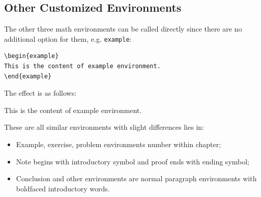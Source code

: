 \documentclass[11pt]{elegantbook}
\begin{document}
\subsection{Other Customized Environments}
The other three math environments can be called directly since there are no additional option for them, e.g. \lstinline{example}:
\begin{lstlisting}
\begin{example}
This is the content of example environment.
\end{example}
\end{lstlisting}

The effect is as follows:

\begin{example}
This is the content of example environment.
\end{example}

These are all similar environments with slight differences lies in:

\begin{itemize}
   \item Example, exercise, problem environments number within chapter;
   \item Note begins with introductory symbol and proof ends with ending symbol;
   \item Conclusion and other environments are normal paragraph environments with boldfaced introductory words.
\end{itemize}
\end{document}
